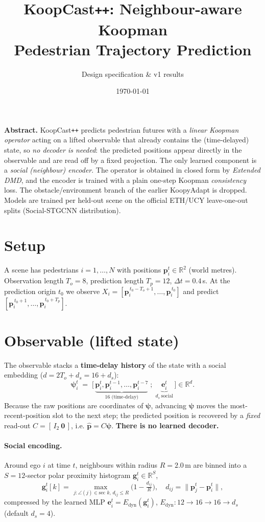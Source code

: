 \documentclass[11pt]{article}
\title{\textbf{KoopCast\texttt{++}: Neighbour-aware Koopman\\ Pedestrian Trajectory Prediction}}
\author{Design specification \& v1 results}
\date{\today}
\newcommand{\R}{\mathbb{R}}
\newcommand{\pos}{\mathbf{p}}
\newcommand{\psib}{\bm{\psi}}
\begin{document}
\maketitle

\noindent\textbf{Abstract.} KoopCast\texttt{++} predicts pedestrian futures with
a \emph{linear Koopman operator} acting on a lifted observable that already
contains the (time-delayed) state, so \emph{no decoder is needed}: the predicted
positions appear directly in the observable and are read off by a fixed
projection. The only learned component is a \emph{social (neighbour) encoder}.
The operator is obtained in closed form by \emph{Extended DMD}, and the encoder
is trained with a plain one-step Koopman \emph{consistency} loss. The
obstacle/environment branch of the earlier KoopyAdapt is dropped. Models are
trained per held-out scene on the official ETH/UCY leave-one-out splits
(Social-STGCNN distribution).

\section{Setup}
A scene has pedestrians $i=1,\dots,N$ with positions $\pos_i^t\in\R^2$ (world
metres). Observation length $T_o{=}8$, prediction length $T_p{=}12$,
$\Delta t{=}0.4$\,s. At the prediction origin $t_0$ we observe
$X_i=[\pos_i^{\,t_0-T_o+1},\dots,\pos_i^{\,t_0}]$ and predict
$[\pos_i^{\,t_0+1},\dots,\pos_i^{\,t_0+T_p}]$.

\section{Observable (lifted state)}
The observable stacks a \textbf{time-delay history} of the state with a social
embedding ($d = 2T_o + d_s = 16 + d_s$):
\[
  \psib_i^t \;=\;
  \big[\,\underbrace{\pos_i^{t},\pos_i^{t-1},\dots,\pos_i^{t-7}}_{\text{16 (time-delay)}}\;;\;
  \underbrace{\mathbf{e}_i^t}_{d_s\ \text{social}}\,\big]\in\R^{d}.
\]
Because the raw positions are coordinates of $\psib$, advancing $\psib$ moves the
most-recent-position slot to the next step; the predicted position is recovered
by a \emph{fixed} read-out $C=[\,I_2\ \mathbf{0}\,]$, i.e. $\hat{\pos}=C\psib$.
\textbf{There is no learned decoder.}

\paragraph{Social encoding.} Around ego $i$ at time $t$, neighbours within
radius $R=2.0$\,m are binned into a $S{=}12$-sector polar proximity histogram
$\mathbf{g}_i^t\in\R^{S}$,
\[
  \mathbf{g}_i^t[k]=\!\!\max_{\,j:\angle(j)\in\text{sec }k,\,d_{ij}\le R}\!\!
  \Big(1-\tfrac{d_{ij}}{R}\Big),\quad d_{ij}=\lVert\pos_j^{t}-\pos_i^{t}\rVert,
\]
compressed by the learned MLP $\mathbf{e}_i^t=E_{\text{dyn}}(\mathbf{g}_i^t)$,
$E_{\text{dyn}}:12\!\to\!16\!\to\!16\!\to\!d_s$ (default $d_s{=}4$).
\end{document}
